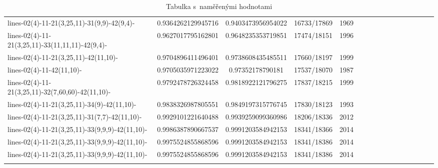 \documentclass[12pt]{report}			%
\begin{document}
\begin{landscape}
\begin{longtable}{ | p{5cm} | *{15}{c|}}
lines-02(4)-11-21(3,25,11)-31(9,9)-42(9,4)-       & 0.9364262129945716  & 0.9403473956954022  & 16733/17869 & 1969 \\
lines-02(4)-11-21(3,25,11)-33(11,11,11)-42(9,4)-   & 0.9627017795162801  & 0.9648235353719851  & 17474/18151 & 1996 \\
lines-02(4)-11-21(3,25,11)-42(11,10)-             & 0.9704896411496401  & 0.9738608435485511  & 17660/18197 & 1999 \\
lines-02(4)-11-42(11,10)-                         & 0.9705035971223022  & 0.97352178790181    & 17537/18070 & 1987 \\
lines-02(4)-11-21(3,25,11)-32(7,60,60)-42(11,10)- & 0.9792478726324458  & 0.9818922121796275  & 17837/18215 & 1999 \\
lines-02(4)-11-21(3,25,11)-34(9)-42(11,10)-       & 0.9838326987805551  & 0.9849197315776745  & 17830/18123 & 1993 \\
lines-02(4)-11-21(3,25,11)-31(7,7)-42(11,10)-     & 0.9929101221640488  & 0.9939259099360986  & 18206/18336 & 2012 \\
lines-02(4)-11-21(3,25,11)-33(9,9,9)-42(11,10)-   & 0.9986387890667537  & 0.9991203584942153  & 18341/18366 & 2014 \\
lines-02(4)-11-21(3,25,11)-33(9,9,9)-42(11,10)-   & 0.9975524855868596  & 0.9991203584942153  & 18341/18386 & 2014 \\
lines-02(4)-11-21(3,25,11)-33(9,9,9)-42(11,10)-   & 0.9975524855868596  & 0.9991203584942153  & 18341/18386 & 2014\\
\hline
\caption{Tabulka s~naměřenými hodnotami}
\label{table:komplet}
\end{longtable}
\end{landscape}
\end{document}
